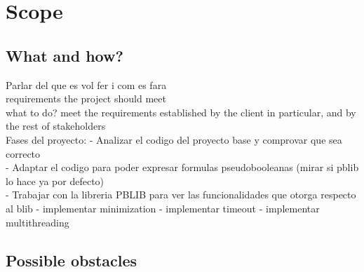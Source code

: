 \chapter{Scope} %

\label{Chapter3} %

\section{What and how?}

Parlar del que es vol fer i com es fara
\\
requirements the project should meet\\
what to do? meet the requirements established by the client in particular, and by the rest of stakeholders\\

Fases del proyecto:
- Analizar el codigo del proyecto base y comprovar que sea correcto\\
- Adaptar el codigo para poder expresar formulas pseudobooleanas (mirar si pblib lo hace ya por defecto)\\
- Trabajar con la libreria PBLIB para ver las funcionalidades que otorga respecto al blib
- implementar minimization
- implementar timeout
- implementar multithreading

\section{Possible obstacles}


